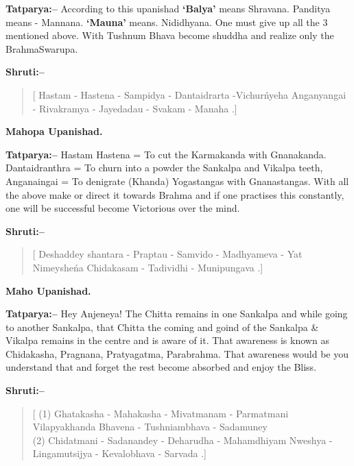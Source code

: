 \textbf{Tatparya:–} According to this upanishad \textbf{‘Balya’} means Shravana. Panditya means - Mannana. \textbf{‘Mauna’} means. Nididhyana. One must give up all the 3 mentioned above. With Tushnum Bhava become shuddha and realize only the BrahmaSwarupa.

\newpage

\textbf{Shruti:–}

\begin{verse}
[ Hastam - Hastena - Sampidya - Dantaidrarta -\break Vichurńyeha  Anganyangai - Rivakramya - Jayedadau - Svakam - Manaha .]
\end{verse}

\begin{flushright}
\textbf{Mahopa Upanishad.}
\end{flushright}

\textbf{Tatparya:–} Hastam Hastena = To cut the Karmakanda with Gnana\break kanda. Dantaidranthra = To churn into a powder the Sankalpa and Vikalpa teeth, Anganaingai = To denigrate (Khanda) Yogastangas with Gnanastangas. With all the above make or direct it towards Brahma and if one practises this constantly, one will be successful become Victorious over the mind.

\textbf{Shruti:–}

\begin{verse}
[ Deshaddey shantara - Praptau - Samvido - Madhyameva - Yat  Nimeysheńa Chidakasam - Tadividhi - Munipungava .]
\end{verse}

\begin{flushright}
\textbf{Maho Upanishad.}
\end{flushright}

\textbf{Tatparya:–} Hey Anjeneya! The Chitta remains in one Sankalpa and while going to another Sankalpa, that Chitta the coming and goind of the Sankalpa \& Vikalpa remains in the centre and is aware of it. That awareness is known as Chidakasha, Pragnana, Pratyagatma, Parabrahma. That awareness would be you understand that and forget the rest become absorbed and enjoy the Bliss.

\textbf{Shruti:–}

\begin{verse}
[ (1) Ghatakasha - Mahakasha - Mivatmanam - Parma\break tmani  Vilapyakhanda Bhavena - Tushniambhava - Sadamuney \\ (2) Chidatmani - Sadanandey - Deharudha - Maham\break dhiyam  Nweshya - Lingamutsijya - Kevalobhava - Sarvada .]
\end{verse}

